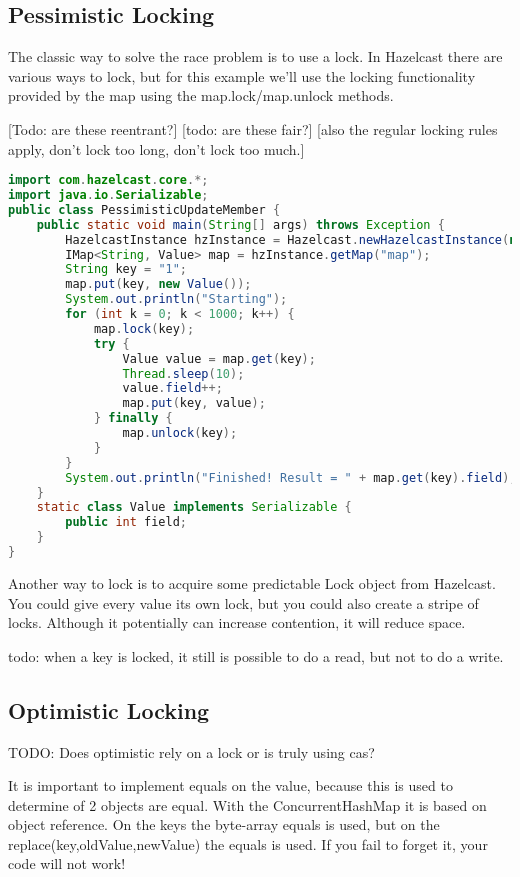 \subsection{Pessimistic Locking}
The classic way to solve the race problem is to use a lock. In Hazelcast there are various ways to lock, but for this example we'll use the locking functionality provided by the map using the map.lock/map.unlock methods.

[Todo: are these reentrant?]
[todo: are these fair?]
[also the regular locking rules apply, don't lock too long, don't lock too much.]

\begin{lstlisting}[language=java]
import com.hazelcast.core.*;
import java.io.Serializable;
public class PessimisticUpdateMember {
    public static void main(String[] args) throws Exception {
        HazelcastInstance hzInstance = Hazelcast.newHazelcastInstance(null);
        IMap<String, Value> map = hzInstance.getMap("map");
        String key = "1";
        map.put(key, new Value());
        System.out.println("Starting");
        for (int k = 0; k < 1000; k++) {
            map.lock(key);
            try {
                Value value = map.get(key);
                Thread.sleep(10);
                value.field++;
                map.put(key, value);
            } finally {
                map.unlock(key);
            }
        }
        System.out.println("Finished! Result = " + map.get(key).field);
    }
    static class Value implements Serializable {
        public int field;
    }
}
\end{lstlisting}
Another way to lock is to acquire some predictable Lock object from Hazelcast. You could give every value its own lock, but you could also create a stripe of locks. Although it potentially can increase contention, it will reduce space.

todo: when a key is locked, it still is possible to do a read, but not to do a write.

\subsection{Optimistic Locking}
TODO: Does optimistic rely on a lock or is truly using cas?

It is important to implement equals on the value, because this is used to determine of 2 objects are equal. With the ConcurrentHashMap it is based on object reference. On the keys the byte-array equals is used, but on the replace(key,oldValue,newValue) the equals is used. If you fail to forget it, your code will not work!

